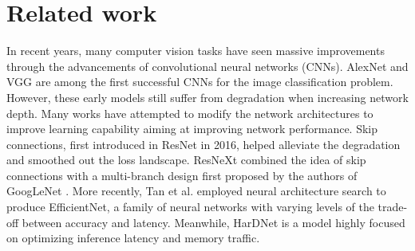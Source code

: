 \documentclass{ieeeaccess}
\begin{document}
\section{Related work}
\label{sec:related}
In recent years, many computer vision tasks have seen massive improvements through the advancements of convolutional neural networks (CNNs). AlexNet \cite{krizhevsky2012imagenet} and VGG \cite{simonyan2014very} are among the first successful CNNs for the image classification problem. However, these early models still suffer from degradation when increasing network depth. Many works have attempted to modify the network architectures to improve learning capability aiming at improving network performance. Skip connections, first introduced in ResNet \cite{he2016deep} in 2016, helped alleviate the degradation and smoothed out the loss landscape. ResNeXt \cite{xie2017aggregated} combined the idea of skip connections with a multi-branch design first proposed by the authors of GoogLeNet \cite{szegedy2015going}. More recently, Tan et al. \cite{tan2019efficientnet} employed neural architecture search to produce EfficientNet, a family of neural networks with varying levels of the trade-off between accuracy and latency. Meanwhile, HarDNet \cite{chao2019hardnet} is a model highly focused on optimizing inference latency and memory traffic.
\end{document}
